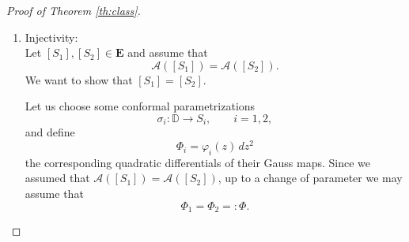 \documentclass[a4paper,11pt,openright,twoside]{book}
\renewcommand{\iff}{\Leftrightarrow}
\newcommand{\M}{\mathbb{M}^{2,1}}
\newcommand{\I}{\mathbf{I}}
\newcommand{\II}{\mathbf{I\!I}}
\newcommand{\1}{\mathds{1}}
\newcommand{\commb}[1]{\textsf{{\footnotesize[#1]}}}
\theoremstyle{plain}
\theoremstyle{definition}
\theoremstyle{remark}
\begin{document}
\begin{proof}[Proof of Theorem \ref{th:class}]
\begin{enumerate}[noitemsep,leftmargin=*,label=\textbf{\arabic*.}]
\begin{itemize}[noitemsep]
	\begin{align*}
		(\nabla_X\II)(Y,Z) &= (\nabla_X(H\I +\II_0))(Y,Z) \\
		\commb{$H$ is constant, $\nabla \I = 0$}\hspace*{1cm} &= (\nabla_X\II_0)(Y,Z)
		\ . \hspace*{2cm}
	\end{align*}
	Hence the Codazzi equation can be rewritten exclusively in terms of the traceless part
	\begin{align*}
		(\nabla_X\II)(Y,Z) = (\nabla_Z \II) (X,Y)\quad \iff \quad (\nabla_X\II_0)(Y,Z) = (\nabla_Z \II_0) (X,Y) 
	\ . 
	\end{align*}
	Since we know that $\II_0$ satisfies the Codazzi equations, also $\II$ does.

	Regarding Gauss' equation, by Theorem \ref{thm:gausseqnthm}, it is equivalent to $w$ solving the equation
	\[
	\Delta_p w = e^{2w}-\|\Phi\|^2e^{-2w}-1\ ,
	\]
	which we assumed to be true by claim.\\

	Hence $\I$ and$\II$ satisfy the Gauss-Codazzi equations and therefore we can apply Bonnet's Theorem \ref{th:bonnet}, finding for every point of $\mathbb{D}$ a local immersion in $\M$, whose first and second fundamental forms are $\I$ and $\II$. Since $\mathbb{D}$ is simply connected, we can glue these local immersions to a global one
	\[
	\iota:\mathbb{D}\to \M,
	\]
	unique up to post-composition with an isometry of $\M$.
	

	The induced metric of $\iota$ is $\I=e^{2w}ds_p^2$, hence complete. Moreover the mean curvature is identically $1$, for how we constructed the forms $\I$ and $\II$. Therefore the image surface is a complete spacelike surface in $\M$ with constant mean curvature $1$. Then, by Proposition \ref{pr:convfun}, it is an entire graph, hence a hyperbolic CMC-$1$ cut.
\end{itemize}
Finally, by construction, the Hopf differential of the Gauss map of the surface we just found is $\Phi$. Therefore
\[
\mathscr A([S])=[\Phi],
\]
and $\mathscr A$ is surjective.
\item Injectivity:\\
Let $[S_1],[S_2]\in \mathbf{E}$ and assume that
\[
\mathscr A([S_1])=\mathscr A([S_2]).
\]
We want to show that $[S_1]=[S_2]$.

Let us choose some conformal parametrizations
\[
\sigma_i:\mathbb{D}\to S_i,
\qquad i=1,2,
\]
and define
\[
\Phi_i=\varphi_i(z)\,dz^2
\]
the corresponding quadratic differentials of their Gauss maps. Since we assumed that 
$
\mathscr A([S_1])=\mathscr A([S_2])
$, up to a change of parameter we may assume that
\[
\Phi_1=\Phi_2=:\Phi.
\]


\end{enumerate}
\end{proof}
\end{document}
